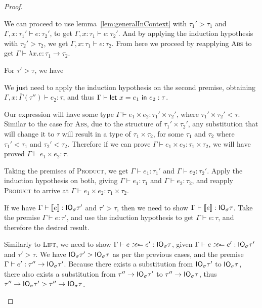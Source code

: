 \begin{proof}
\begin{description}
    We can proceed to use lemma~\ref{lem:generalInContext} with
    $\tau_1' > \tau_1$ and $\Gamma,x : \tau_1' \vdash e : \tau_2'$, to get
    $\Gamma, x : \tau_1 \vdash e : \tau_2'$.  And by applying the induction hypothesis
    with $\tau_2' > \tau_2$, we get $\Gamma, x : \tau_1 \vdash e : \tau_2$. From here we
    proceed by reapplying \textsc{Abs} to get $\Gamma \vdash \lambda x . e : \tau_1 \rightarrow
    \tau_2$.
  \item[\textmd{\boxed{\textsc{Let}}}]
    For $\tau' > \tau$, we have
    \begin{mathpar}
    \end{mathpar}
    We just need to apply the induction hypothesis on the second
    premise, obtaining
    $\Gamma, x : \overline{\Gamma}(\tau'') \vdash e_2 : \tau$, and thus
    $\Gamma \vdash \letin{x = e_1}{e_2} : \tau$.
  \item[\textmd{\boxed{\textsc{Product}}}]
    Our expression will have some type $\Gamma \vdash e_1 \times e_2 : \tau_1' \times \tau_2'$, where $\tau_1' \times
    \tau_2' < \tau$. Similar to the case for \textsc{Abs}, due to the
    structure of $\tau_1' \times \tau_2'$, any substitution that will change it
    to $\tau$ will result in a type of $\tau_1 \times \tau_2$, for some $\tau_1$ and
    $\tau_2$ where $\tau_1' < \tau_1$ and $\tau_2' < \tau_2$. 
    Therefore if we can prove $\Gamma \vdash e_1 \times e_2 : \tau_1 \times \tau_2$, we will
    have proved $\Gamma \vdash e_1 \times e_2 : \tau$.
    
    Taking the premises of \textsc{Product}, we get $\Gamma \vdash e_1 : \tau_1'$
    and $\Gamma \vdash e_2 : \tau_2'$. Apply the induction hypothesis on both, giving
    $\Gamma \vdash e_1 : \tau_1$ and $\Gamma \vdash e_2 : \tau_2$, and reapply \textsc{Product} to
    arrive at $\Gamma \vdash e_1 \times e_2 : \tau_1 \times \tau_2$.
  \item[\textmd{\boxed{\textsc{Lift}}}]
    If we have $\Gamma \vdash \lift{e} : \IO_\sigma \tau'$ and $\tau' > \tau$, then we need to
    show $\Gamma \vdash \lift{e} : \IO_\sigma \tau$. Take the premise $\Gamma \vdash e : \tau'$,
    and use the induction hypothesis to get $\Gamma \vdash e : \tau$, and therefore
    the desired result.
  \item[\textmd{\boxed{\textsc{Bind}}}]
    Similarly to \textsc{Lift}, we need to show $\Gamma \vdash e \bind e' :
    \IO_\sigma \tau$, given $\Gamma \vdash e \bind e' : \IO_\sigma \tau'$ and $\tau' > \tau$.
    We have $\IO_\sigma \tau' > \IO_\sigma \tau$ as per the previous cases, and the
    premise $\Gamma \vdash e' : \tau'' \rightarrow \IO_\sigma \tau'$. Because there exists a
    substitution from $\IO_\sigma \tau'$ to $\IO_\sigma \tau$, there also exists a
    substitution from $\tau'' \rightarrow \IO_\sigma \tau'$ to $\tau'' \rightarrow \IO_\sigma \tau$, thus
    $\tau'' \rightarrow \IO_\sigma \tau' > \tau'' \rightarrow \IO_\sigma \tau$.


\end{description}
\end{proof}
